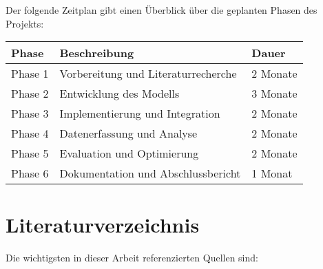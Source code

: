 \documentclass[12pt,a4paper]{article}
\begin{document}
\noindent
Der folgende Zeitplan gibt einen Überblick über die geplanten Phasen des Projekts:

\begin{tabular}{|l|l|l|}
\hline
\textbf{Phase} & \textbf{Beschreibung} & \textbf{Dauer} \\ \hline
Phase 1 & Vorbereitung und Literaturrecherche & 2 Monate \\ \hline
Phase 2 & Entwicklung des Modells & 3 Monate \\ \hline
Phase 3 & Implementierung und Integration & 2 Monate \\ \hline
Phase 4 & Datenerfassung und Analyse & 2 Monate \\ \hline
Phase 5 & Evaluation und Optimierung & 2 Monate \\ \hline
Phase 6 & Dokumentation und Abschlussbericht & 1 Monat \\ \hline
\end{tabular}

\newpage
\section*{Literaturverzeichnis}

\noindent
Die wichtigsten in dieser Arbeit referenzierten Quellen sind:

 
\end{document}

